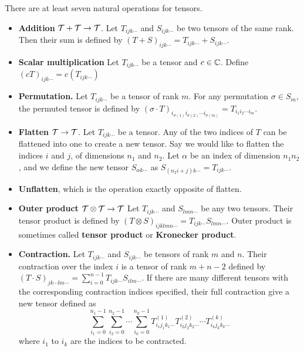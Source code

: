 There are at least seven natural operations for tensors.
\begin{observation}
	\begin{itemize} 
		\item \textbf{Addition} $\mathcal{T} + \mathcal{T} \rightarrow \mathcal{T}$. Let $T_{ijk \cdots}$ and $S_{ijk \cdots}$ be two tensors of the same rank. Then their sum is defined by $(T + S)_{ijk \cdots} = T_{ijk \cdots} + S_{ijk \cdots}$.
		\item \textbf{Scalar multiplication} Let $T_{ijk \cdots}$ be a tensor and $c \in \mathbb{C}$. Define $(cT)_{ijk \cdots} =c (T_{ijk \cdots}) $
		\item \textbf{Permutation.} Let $T_{ijk\cdots}$ be a tensor of rank $m$. For any permutation $\sigma \in S_m$, the permuted tensor is defined by $(\sigma \cdot T)_{i_{\sigma(1)} i_{\sigma(2)} \cdots i_{\sigma(m)}} = T_{i_1 i_2 \cdots i_m}$.
		\item \textbf{Flatten} $\mathcal{T} \rightarrow \mathcal{T}$. Let $T_{ijk \cdots}$ be a tensor. 
		Any of the two indices of $T$ can be flattened into one to create a new tensor.
		Say we would like to flatten the indices $i$ and $j$, of dimensions $n_1$ and $n_2$. Let $\alpha$ be an index of dimension $n_1n_2$, and we define the new tensor $S_{\alpha k \cdots}$ as $S_{(n_2 i + j)k \cdots} = T_{ijk\cdots}$.
		\item \textbf{Unflatten}, which is the operation exactly opposite of flatten.
		\item \textbf{Outer product} $\mathcal{T} \otimes \mathcal{T} \rightarrow \mathcal{T}$ Let $T_{ijk \cdots}$ and $S_{lmn \cdots}$ be any two tensors.
		Their tensor product is defined by $(T \otimes S)_{ijklmn\cdots} = T_{ijk\cdots} S_{lmn\cdots}$. Outer product is sometimes called \textbf{tensor product} or \textbf{Kronecker product}.
		\item \textbf{Contraction.} Let $T_{ijk\cdots}$ and $S_{ijk \cdots}$ be tensors of rank $m$ and $n$. Their contraction over the index $i$ is a tensor of rank $m+n - 2$ defined by $(T \cdot S)_{jk\cdots lm\cdots} = \sum_{i=0}^{n-1} T_{ijk\cdots} S_{ilm\cdots}$.
		If there are many different tensors with the corresponding contraction indices specified, their full contraction give a new tensor defined as 
		\begin{equation}
			\sum_{i_1=0}^{n_1-1} \sum_{i_2=0}^{n_2-1} \cdots \sum_{i_k=0}^{n_k-1} T^{(1)}_{i_1 j_1 k_1 \cdots} T^{(2)}_{i_2 j_2 k_2 \cdots} \cdots T^{(k)}_{i_k j_k k_k \cdots}
		\end{equation}\label{eq:contraction}
		where $i_1$ to $i_k$ are the indices to be contracted.
	\end{itemize}
\end{observation}

